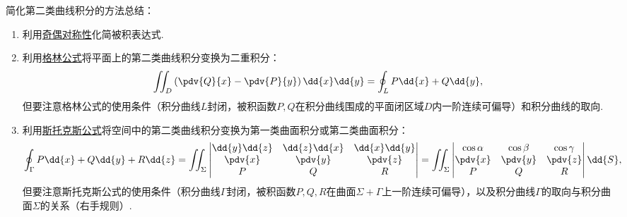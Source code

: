 简化第二类曲线积分的方法总结：\begin{enumerate}
	\item 利用\hyperref[section:线积分与面积分.利用对称性简化第二类曲线积分的计算]{奇偶对称性}化简被积表达式.

	\item 利用\hyperref[equation:线积分与面积分.格林公式]{格林公式}将平面上的第二类曲线积分变换为二重积分：\begin{equation*}
		\iint_D \left( \pdv{Q}{x} - \pdv{P}{y} \right) \dd{x}\dd{y}
		= \oint_L P\dd{x} + Q\dd{y},
	\end{equation*}
	但要注意格林公式的使用条件（积分曲线\(L\)封闭，被积函数\(P,Q\)在积分曲线围成的平面闭区域\(D\)内一阶连续可偏导）和积分曲线的取向.

	\item 利用\hyperref[equation:线积分与面积分.斯托克斯公式]{斯托克斯公式}将空间中的第二类曲线积分变换为第一类曲面积分或第二类曲面积分：\begin{equation*}
		\oint_\Gamma P\dd{x}+Q\dd{y}+R\dd{z}
		= \iint_\Sigma \begin{vmatrix}
			\dd{y}\dd{z} & \dd{z}\dd{x} & \dd{x}\dd{y} \\
			\pdv{x} & \pdv{y} & \pdv{z} \\
			P & Q & R
		\end{vmatrix}
		= \iint_\Sigma \begin{vmatrix}
			\cos\alpha & \cos\beta & \cos\gamma \\
			\pdv{x} & \pdv{y} & \pdv{z} \\
			P & Q & R
		\end{vmatrix} \dd{S},
	\end{equation*}
	但要注意斯托克斯公式的使用条件（积分曲线\(\Gamma\)封闭，被积函数\(P,Q,R\)在曲面\(\Sigma+\Gamma\)上一阶连续可偏导），以及积分曲线\(\Gamma\)的取向与积分曲面\(\Sigma\)的关系（右手规则）.
\end{enumerate}

